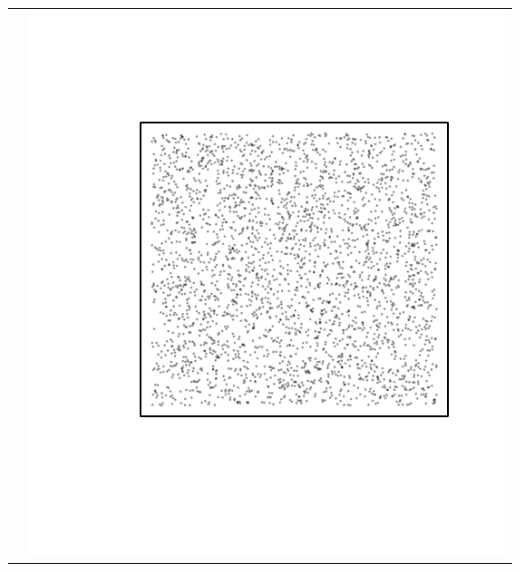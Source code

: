 \documentclass{article}\usepackage{graphicx, color}
\makeatletter
\def\maxwidth{ %
  \ifdim\Gin@nat@width>\linewidth
    \linewidth
  \else
    \Gin@nat@width
  \fi
}
\newenvironment{knitrout}{}{} %
\makeatother
\begin{document}
\begin{tabular}{cc}
&
\begin{knitrout}
\definecolor{shadecolor}{rgb}{0.969, 0.969, 0.969}\color{fgcolor}\includegraphics[width=\maxwidth]{figure/unnamed-chunk-20} 
\end{knitrout}

\\
\end{tabular}
\end{document}
